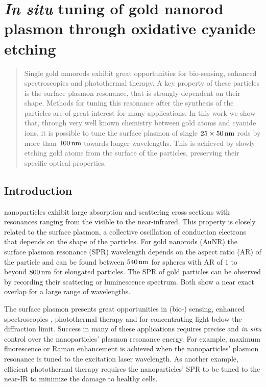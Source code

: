 \chapter[Cyanide Etching]{\textit{In situ} tuning of gold nanorod plasmon
through oxidative cyanide etching}
\label{ch:KCN}


\begin{abstract}
Single gold nanorods exhibit great opportunities for
bio-sensing, enhanced spectroscopies and photothermal therapy. A key property of these
particles is the surface plasmon resonance, that is strongly dependent on their
shape. Methods for tuning this resonance after the synthesis of the particles
are of great interest for many applications. In this work we show that, through
very well known chemistry between gold atoms and cyanide ions, it is possible
to tune the surface plasmon of single $25\times50\,\textrm{nm}$ rods by more than $100\,\textrm{nm}$
towards longer wavelengths. This is achieved by slowly etching gold atoms from
the surface of the particles, preserving their specific optical properties.
\end{abstract}	

\newpage

\section{Introduction}

 nanoparticles exhibit large absorption and scattering cross
sections with resonances ranging from the visible to the near-infrared. This property is
closely related to the surface plasmon, a collective oscillation of conduction
electrons that depends on the shape of the particles. For gold nanorods (AuNR)
the surface plasmon resonance (SPR) wavelength depends on the aspect ratio (AR)
of the particle and can be found between $540\,\textrm{nm}$ for spheres with AR of $1$ to
beyond $800\,\textrm{nm}$ for elongated particles. The SPR of gold particles
can be observed by recording their scattering or luminescence
spectrum\cite{Sonnichsen2002}. Both show a near exact overlap for a large range
of wavelengths\cite{Yorulmaz2012}.

The surface plasmon presents great opportunities in (bio-)
sensing\cite{Zijlstra2012}, enhanced spectroscopies \cite{Sivapalan2013},
photothermal therapy\cite{Zhao2014} and for concentrating light below the
diffraction limit\cite{Zijlstra2011}. Success in many of these applications
requires precise and \textit{in situ} control over the nanoparticles' plasmon
resonance energy. For example, maximum fluorescence\cite{Khatua2014} or Raman
enhancement\cite{McFarland2005} is achieved when the nanoparticles' plasmon
resonance is tuned to the excitation laser wavelength. As another example,
efficient photothermal therapy requires the nanoparticles' SPR to be tuned to
the near-IR to minimize the damage to healthy cells\cite{Alkilany2012}.

